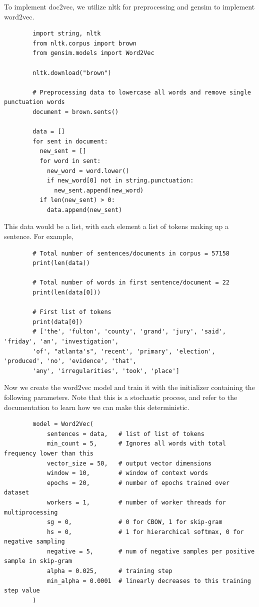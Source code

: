 \documentclass{article}
\begin{document}
      To implement doc2vec, we utilize nltk for preprocessing and gensim to implement word2vec. 
      \begin{lstlisting}
        import string, nltk
        from nltk.corpus import brown
        from gensim.models import Word2Vec
         
        nltk.download("brown")

        # Preprocessing data to lowercase all words and remove single punctuation words
        document = brown.sents()

        data = []
        for sent in document:
          new_sent = []
          for word in sent:
            new_word = word.lower()
            if new_word[0] not in string.punctuation:
              new_sent.append(new_word)
          if len(new_sent) > 0:
            data.append(new_sent)
      \end{lstlisting}
      This data would be a list, with each element a list of tokens making up a sentence. For example, 
      \begin{lstlisting}
        # Total number of sentences/documents in corpus = 57158
        print(len(data))

        # Total number of words in first sentence/document = 22
        print(len(data[0]))

        # First list of tokens 
        print(data[0])
        # ['the', 'fulton', 'county', 'grand', 'jury', 'said', 'friday', 'an', 'investigation', 
        'of', "atlanta's", 'recent', 'primary', 'election', 'produced', 'no', 'evidence', 'that', 
        'any', 'irregularities', 'took', 'place']
      \end{lstlisting}
      Now we create the word2vec model and train it with the initializer containing the following parameters. Note that this is a stochastic process, and refer to the documentation to learn how we can make this deterministic. 
      \begin{lstlisting}
        model = Word2Vec(
            sentences = data,   # list of list of tokens 
            min_count = 5,      # Ignores all words with total frequency lower than this
            vector_size = 50,   # output vector dimensions
            window = 10,        # window of context words 
            epochs = 20,        # number of epochs trained over dataset 
            workers = 1,        # number of worker threads for multiprocessing
            sg = 0,             # 0 for CBOW, 1 for skip-gram
            hs = 0,             # 1 for hierarchical softmax, 0 for negative sampling
            negative = 5,       # num of negative samples per positive sample in skip-gram
            alpha = 0.025,      # training step
            min_alpha = 0.0001  # linearly decreases to this training step value 
        )
      \end{lstlisting}
\end{document}
